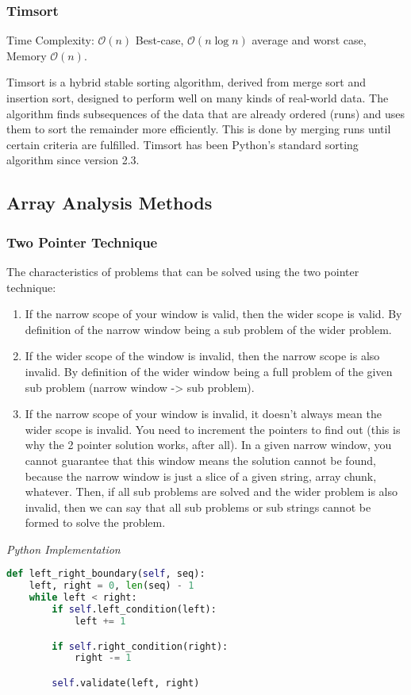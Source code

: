 \documentclass{article}
\newcommand{\bigO}{\ensuremath{\mathcal{O}}}
\begin{document}
    \subsubsection{Timsort}
    Time Complexity: $\bigO(n)$ Best-case, $\bigO(n\log n)$  average and worst case, Memory $\bigO(n)$.
    
    Timsort is a hybrid stable sorting algorithm, derived from merge sort and insertion sort, designed to perform well on many kinds of real-world data. The algorithm finds subsequences of the data that are already ordered (runs) and uses them to sort the remainder more efficiently. This is done by merging runs until certain criteria are fulfilled. Timsort has been Python's standard sorting algorithm since version 2.3.
    
    \subsection{Array Analysis Methods}

    \subsubsection{Two Pointer Technique}
    The characteristics of problems that can be solved using the two pointer technique:
    \begin{enumerate}
        \item If the narrow scope of your window is valid, then the wider scope is valid. By definition of the narrow window being a sub problem of the wider problem.
        \item If the wider scope of the window is invalid, then the narrow scope is also invalid. By definition of the wider window being a full problem of the given sub problem (narrow window -> sub problem).
        \item If the narrow scope of your window is invalid, it doesn't always mean the wider scope is invalid. You need to increment the pointers to find out (this is why the 2 pointer solution works, after all). In a given narrow window, you cannot guarantee that this window means the solution cannot be found, because the narrow window is just a slice of a given string, array chunk, whatever. Then, if all sub problems are solved and the wider problem is also invalid, then we can say that all sub problems or sub strings cannot be formed to solve the problem.
    \end{enumerate}

\vspace{8pt} \emph{Python Implementation}
\begin{lstlisting}[language=Python]
def left_right_boundary(self, seq):
    left, right = 0, len(seq) - 1
    while left < right:
        if self.left_condition(left):
            left += 1

        if self.right_condition(right):
            right -= 1

        self.validate(left, right)
\end{lstlisting}
  
\end{document}
